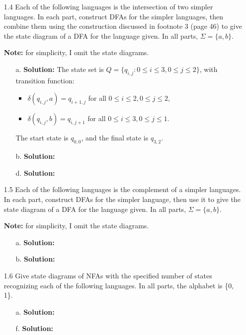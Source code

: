 \begin{enumerate}
\item[1.4]Each of the following languages is the intersection of two simpler languages. In each part, construct DFAs for the simpler languages, then combine them using the construction discussed in footnote 3 (page 46) to give the state diagram of a DFA for the language given. In all parts, $\Sigma = \{a, b\}$.

\par \textbf{Note:} for simplicity, I omit the state diagrams. 
\begin{enumerate}
\item[a.]\textbf{Solution:} The state set is $Q = \{q_{i, j} \colon 0 \le i \le 3, 0 \le j \le 2\}$, with transition function:
\begin{itemize}
\item $\delta(q_{i, j}, a) = q_{i+1, j}$ for all $0 \le i \le 2, 0 \le j \le 2$,
\item $\delta(q_{i, j}, b) = q_{i, j+1}$ for all $0 \le i \le 3, 0 \le j \le 1$.
\end{itemize}
The start state is $q_{0, 0}$, and the final state is $q_{3, 2}$. 
\item[b.]\textbf{Solution:} \alreadyanswered
\item[d.]\textbf{Solution:} \alreadyanswered
\end{enumerate}

\item[1.5]Each of the following languages is the complement of a simpler languages. In each part, construct DFAs for the simpler language, then use it to give the state diagram of a DFA for the language given. In all parts, $\Sigma = \{a, b\}$.

\par \textbf{Note:} for simplicity, I omit the state diagrams. 
\begin{enumerate}
\item[a.]\textbf{Solution:} \alreadyanswered
\item[b.]\textbf{Solution:} \alreadyanswered
\end{enumerate}

\item[1.6]Give state diagrams of NFAs with the specified number of states recognizing each of the following languages. In all parts, the alphabet is \{0, 1\}.
\begin{enumerate}
\item[a.]\textbf{Solution:} \alreadyanswered
\item[f.]\textbf{Solution:} \alreadyanswered
\end{enumerate}


\end{enumerate}

